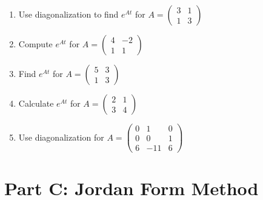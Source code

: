 \documentclass[12pt]{article}
\begin{document}
\begin{enumerate}[start=6]
\item Use diagonalization to find $e^{At}$ for $A = \begin{pmatrix} 3 & 1 \\ 1 & 3 \end{pmatrix}$

\item Compute $e^{At}$ for $A = \begin{pmatrix} 4 & -2 \\ 1 & 1 \end{pmatrix}$

\item Find $e^{At}$ for $A = \begin{pmatrix} 5 & 3 \\ 1 & 3 \end{pmatrix}$

\item Calculate $e^{At}$ for $A = \begin{pmatrix} 2 & 1 \\ 3 & 4 \end{pmatrix}$

\item Use diagonalization for $A = \begin{pmatrix} 0 & 1 & 0 \\ 0 & 0 & 1 \\ 6 & -11 & 6 \end{pmatrix}$
\end{enumerate}

\section*{Part C: Jordan Form Method}
\end{document}
